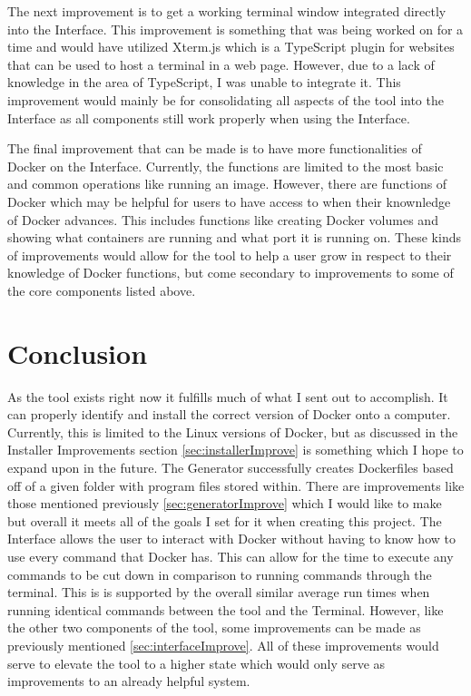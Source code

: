 The next improvement is to get a working terminal window integrated directly into the Interface. This improvement is something that was being worked on for a time and would have utilized Xterm.js \cite{xterm} which is a TypeScript plugin for websites that can be used to host a terminal in a web page. However, due to a lack of knowledge in the area of TypeScript, I was unable to integrate it. This improvement would mainly be for consolidating all aspects of the tool into the Interface as all components still work properly when using the Interface.

The final improvement that can be made is to have more functionalities of Docker on the Interface. Currently, the functions are limited to the most basic and common operations like running an image. However, there are functions of Docker which may be helpful for users to have access to when their knownledge of Docker advances. This includes functions like creating Docker volumes and showing what containers are running and what port it is running on. These kinds of improvements would allow for the tool to help a user grow in respect to their knowledge of Docker functions, but come secondary to improvements to some of the core components listed above.

\section{Conclusion}
\label{sec:conclusion}

As the tool exists right now it fulfills much of what I sent out to accomplish. It can properly identify and install the correct version of Docker onto a computer. Currently, this is limited to the Linux versions of Docker, but as discussed in the Installer Improvements section \ref{sec:installerImprove} is something which I hope to expand upon in the future. The Generator successfully creates Dockerfiles based off of a given folder with program files stored within. There are improvements like those mentioned previously \ref{sec:generatorImprove} which I would like to make but overall it meets all of the goals I set for it when creating this project. The Interface allows the user to interact with Docker without having to know how to use every command that Docker has. This can allow for the time to execute any commands to be cut down in comparison to running commands through the terminal. This is is supported by the overall similar average run times when running identical commands between the tool and the Terminal. However, like the other two components of the tool, some improvements can be made as previously mentioned \ref{sec:interfaceImprove}. All of these improvements would serve to elevate the tool to a higher state which would only serve as improvements to an already helpful system.
